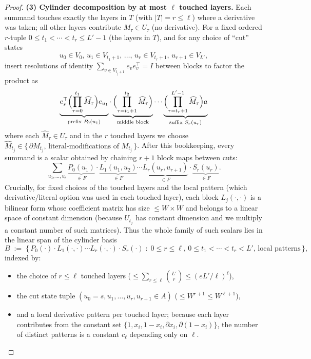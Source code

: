 \documentclass[12pt]{article}
\theoremstyle{definition}
\theoremstyle{definition}
\theoremstyle{remark}
\theoremstyle{remark}
\begin{document}
\begin{proof}
\textbf{(3) Cylinder decomposition by at most $\ell$ touched layers.}
Each summand touches exactly the layers in $T$ (with $|T| = r \le \ell$) where a derivative was taken; all other layers contribute $M_\tau \in U_\tau$ (no derivative). For a fixed ordered $r$-tuple $0 \le t_1 < \cdots < t_r \le L'-1$ (the layers in $T$), and for any choice of ``cut'' states
\[
u_0 \in V_0,\, u_1 \in V_{t_1+1},\, \ldots,\, u_r \in V_{t_r+1},\, u_{r+1} \in V_{L'},
\]
insert resolutions of identity $\sum_{v \in V_{t_j+1}} e_v e_v^\top = I$ between blocks to factor the product as
\[
\underbrace{e_s^\top \Bigl(\prod_{\tau=0}^{t_1} \widehat{M}_\tau\Bigr) e_{u_1}}_{\text{prefix }P_0(u_1)} \cdot \underbrace{\Bigl(\prod_{\tau=t_1+1}^{t_2} \widehat{M}_\tau\Bigr)}_{\text{middle block}} \cdots \underbrace{\Bigl(\prod_{\tau=t_r+1}^{L'-1} \widehat{M}_\tau\Bigr) a}_{\text{suffix }S_r(u_r)}
\]
where each $\widehat{M}_\tau \in U_\tau$ and in the $r$ touched layers we choose $\widehat{M}_{t_j} \in \{\, \partial M_{t_j},\, \text{literal-modifications of }M_{t_j}\,\}$. After this bookkeeping, every summand is a scalar obtained by chaining $r+1$ block maps between cuts:
\[
\sum_{u_1, \ldots, u_r} \underbrace{P_0(u_1)}_{\in F} \cdot \underbrace{L_1(u_1, u_2)}_{\in F} \cdots \underbrace{L_r(u_r, u_{r+1})}_{\in F} \cdot \underbrace{S_r(u_r)}_{\in F}.
\]
Crucially, for fixed choices of the touched layers and the local pattern (which derivative/literal option was used in each touched layer), each block $L_j(\cdot,\cdot)$ is a bilinear form whose coefficient matrix has size $\le W \times W$ and belongs to a linear space of constant dimension (because $U_{t_j}$ has constant dimension and we multiply a constant number of such matrices). Thus the whole family of such scalars lies in the linear span of the cylinder basis
\[
B \;:=\; \{\, P_0(\cdot) \cdot L_1(\cdot,\cdot) \cdots L_r(\cdot,\cdot) \cdot S_r(\cdot) \;:\; 0 \le r \le \ell,\, 0 \le t_1 < \cdots < t_r < L',\, \text{local patterns}\,\},
\]
indexed by:
\begin{itemize}
\item the choice of $r \le \ell$ touched layers ($\le \sum_{r \le \ell} \binom{L'}{r} \le (eL'/\ell)^\ell$),
\item the cut state tuple $(u_0 = s, u_1, \ldots, u_r, u_{r+1} \in A)$ ($\le W^{r+1} \le W^{\ell+1}$),
\item and a local derivative pattern per touched layer; because each layer contributes from the constant set $\{1, x_i, 1-x_i, \partial x_i, \partial(1-x_i)\}$, the number of distinct patterns is a constant $c_\ell$ depending only on $\ell$.
\end{itemize}


\end{proof}
\end{document}
